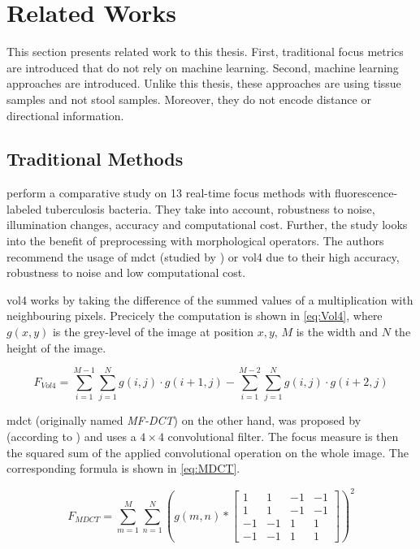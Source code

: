 \section{Related Works}
\label{sec:Foundations:RelatedWorks}

This section presents related work to this thesis. First, traditional focus metrics are introduced that do not rely on machine learning. Second, machine learning approaches are introduced. Unlike this thesis, these approaches are using tissue samples and not stool samples. Moreover, they do not encode distance or directional information.

\subsection{Traditional Methods}
\label{sec:Foundations:RelatedWorks:Traditional}


\textcite{mateos-perez2012comparative} perform a comparative study on 13 real-time focus methods with fluorescence-labeled tuberculosis bacteria. They take into account, robustness to noise, illumination changes, accuracy and computational cost. Further, the study looks into the benefit of preprocessing with morphological operators.
The authors recommend the usage of \ac{mdct} (studied by \textcite{lee2008enhanced}) or \ac{vol4} \cite{vollath1988influence} due to their high accuracy, robustness to noise and low computational cost.

\ac{vol4} works by taking the difference of the summed values of a multiplication with neighbouring pixels. Precicely the computation is shown in \autoref{eq:Vol4}, where $g(x, y)$ is the grey-level of the image at position $x,y$, $M$ is the width and $N$ the height of the image.

\begin{equation}
    \label{eq:Vol4}
    F_{Vol4} = \sum_{i=1}^{M-1}\sum_{j=1}^{N} g(i,j) \cdot g(i+1, j) - \sum_{i=1}^{M-2}\sum_{j=1}^{N} g(i,j) \cdot g(i+2, j)
\end{equation}


\Ac{mdct} (originally named \emph{MF-DCT}) on the other hand, was proposed by \textcite{lee2008enhanced} (according to \textcite{redondo2012autofocus}) and uses a $4 \times 4$ convolutional filter. The focus measure is then the squared sum of the applied convolutional operation on the whole image. The corresponding formula is shown in \autoref{eq:MDCT}.

\begin{equation}
    \label{eq:MDCT}
    F_{MDCT}= \sum_{m=1}^{M}\sum_{n=1}^{N}
    ( g(m,n) *
    \begin{bmatrix}
        1 & 1 & -1 & -1 \\
        1 & 1 & -1 & -1 \\
        -1 & -1 & 1 & 1 \\
        -1 & -1 & 1 & 1
    \end{bmatrix}
    )^2
\end{equation}

